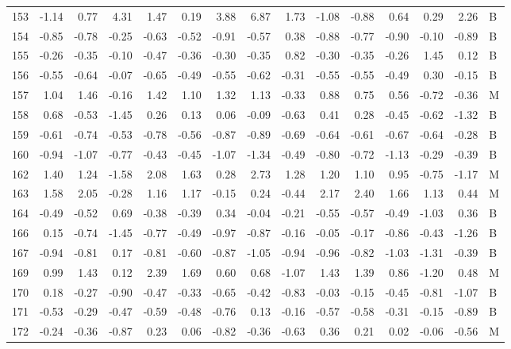 \begin{table}[ht]
\begin{tabular}{rrrrrrrrrrrrrrl}
  153 & -1.14 & 0.77 & 4.31 & 1.47 & 0.19 & 3.88 & 6.87 & 1.73 & -1.08 & -0.88 & 0.64 & 0.29 & 2.26 & B \\ 
  154 & -0.85 & -0.78 & -0.25 & -0.63 & -0.52 & -0.91 & -0.57 & 0.38 & -0.88 & -0.77 & -0.90 & -0.10 & -0.89 & B \\ 
  155 & -0.26 & -0.35 & -0.10 & -0.47 & -0.36 & -0.30 & -0.35 & 0.82 & -0.30 & -0.35 & -0.26 & 1.45 & 0.12 & B \\ 
  156 & -0.55 & -0.64 & -0.07 & -0.65 & -0.49 & -0.55 & -0.62 & -0.31 & -0.55 & -0.55 & -0.49 & 0.30 & -0.15 & B \\ 
  157 & 1.04 & 1.46 & -0.16 & 1.42 & 1.10 & 1.32 & 1.13 & -0.33 & 0.88 & 0.75 & 0.56 & -0.72 & -0.36 & M \\ 
  158 & 0.68 & -0.53 & -1.45 & 0.26 & 0.13 & 0.06 & -0.09 & -0.63 & 0.41 & 0.28 & -0.45 & -0.62 & -1.32 & B \\ 
  159 & -0.61 & -0.74 & -0.53 & -0.78 & -0.56 & -0.87 & -0.89 & -0.69 & -0.64 & -0.61 & -0.67 & -0.64 & -0.28 & B \\ 
  160 & -0.94 & -1.07 & -0.77 & -0.43 & -0.45 & -1.07 & -1.34 & -0.49 & -0.80 & -0.72 & -1.13 & -0.29 & -0.39 & B \\ 
  162 & 1.40 & 1.24 & -1.58 & 2.08 & 1.63 & 0.28 & 2.73 & 1.28 & 1.20 & 1.10 & 0.95 & -0.75 & -1.17 & M \\ 
  163 & 1.58 & 2.05 & -0.28 & 1.16 & 1.17 & -0.15 & 0.24 & -0.44 & 2.17 & 2.40 & 1.66 & 1.13 & 0.44 & M \\ 
  164 & -0.49 & -0.52 & 0.69 & -0.38 & -0.39 & 0.34 & -0.04 & -0.21 & -0.55 & -0.57 & -0.49 & -1.03 & 0.36 & B \\ 
  166 & 0.15 & -0.74 & -1.45 & -0.77 & -0.49 & -0.97 & -0.87 & -0.16 & -0.05 & -0.17 & -0.86 & -0.43 & -1.26 & B \\ 
  167 & -0.94 & -0.81 & 0.17 & -0.81 & -0.60 & -0.87 & -1.05 & -0.94 & -0.96 & -0.82 & -1.03 & -1.31 & -0.39 & B \\ 
  169 & 0.99 & 1.43 & 0.12 & 2.39 & 1.69 & 0.60 & 0.68 & -1.07 & 1.43 & 1.39 & 0.86 & -1.20 & 0.48 & M \\ 
  170 & 0.18 & -0.27 & -0.90 & -0.47 & -0.33 & -0.65 & -0.42 & -0.83 & -0.03 & -0.15 & -0.45 & -0.81 & -1.07 & B \\ 
  171 & -0.53 & -0.29 & -0.47 & -0.59 & -0.48 & -0.76 & 0.13 & -0.16 & -0.57 & -0.58 & -0.31 & -0.15 & -0.89 & B \\ 
  172 & -0.24 & -0.36 & -0.87 & 0.23 & 0.06 & -0.82 & -0.36 & -0.63 & 0.36 & 0.21 & 0.02 & -0.06 & -0.56 & M \\ 

\end{tabular}
\end{table}
